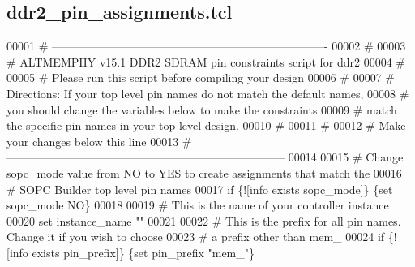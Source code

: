 \subsection{ddr2\+\_\+pin\+\_\+assignments.\+tcl}
\label{ddr2__pin__assignments_8tcl_source}

\begin{DoxyCode}
00001 \textcolor{comment}{# -------------------------------------------------------------------------}
00002 \textcolor{comment}{}\textcolor{comment}{#}
00003 \textcolor{comment}{}\textcolor{comment}{# ALTMEMPHY v15.1 DDR2 SDRAM pin constraints script for ddr2}
00004 \textcolor{comment}{}\textcolor{comment}{#}
00005 \textcolor{comment}{}\textcolor{comment}{# Please run this script before compiling your design}
00006 \textcolor{comment}{}\textcolor{comment}{#}
00007 \textcolor{comment}{}\textcolor{comment}{# Directions: If your top level pin names do not match the default names, }
00008 \textcolor{comment}{}\textcolor{comment}{#             you should change the variables below to make the constraints }
00009 \textcolor{comment}{}\textcolor{comment}{#             match the specific pin names in your top level design.}
00010 \textcolor{comment}{}\textcolor{comment}{#}
00011 \textcolor{comment}{}\textcolor{comment}{#}
00012 \textcolor{comment}{}\textcolor{comment}{# Make your changes below this line}
00013 \textcolor{comment}{}\textcolor{comment}{# --------------------------------------------------------------------------}
00014 \textcolor{comment}{}
00015 \textcolor{comment}{# Change sopc\_mode value from NO to YES to create assignments that match the}
00016 \textcolor{comment}{}\textcolor{comment}{# SOPC Builder top level pin names}
00017 \textcolor{comment}{}\textcolor{keyword}{if} \{![info exists sopc\_mode]\} \{\textcolor{keyword}{set} sopc\_mode NO\}\textcolor{comment}{}
00018 \textcolor{comment}{}
00019 \textcolor{comment}{# This is the name of your controller instance}
00020 \textcolor{comment}{}\textcolor{keyword}{set} instance\_name ""\textcolor{comment}{}
00021 \textcolor{comment}{}
00022 \textcolor{comment}{# This is the prefix for all pin names. Change it if you wish to choose}
00023 \textcolor{comment}{}\textcolor{comment}{# a prefix other than mem\_}
00024 \textcolor{comment}{}\textcolor{keyword}{if} \{![info exists pin\_prefix]\} \{\textcolor{keyword}{set} pin\_prefix "mem\_"\}\textcolor{comment}{}

\end{DoxyCode}
